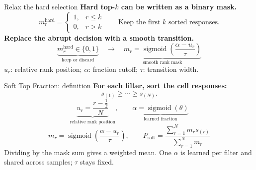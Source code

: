 \documentclass[aspectratio=169,10pt]{beamer}
\begin{document}
\begin{frame}{Relax the hard selection}
\textbf{Hard top-$k$ can be written as a binary mask.}
\[m_r^{\mathrm{hard}}=\begin{cases}1,&r\le k\\0,&r>k\end{cases}
\qquad\text{Keep the first $k$ sorted responses.}\]
\vspace{3mm}
\textbf{Replace the abrupt decision with a smooth transition.}
\[\underbrace{m_r^{\mathrm{hard}}\in\{0,1\}}_{\text{keep or discard}}
\quad\longrightarrow\quad
\underbrace{m_r=\operatorname{sigmoid}\!\left(\frac{\alpha-u_r}{\tau}\right)}_{\text{smooth rank mask}}\]
\small $u_r$: relative rank position; $\alpha$: fraction cutoff; $\tau$: transition width.
\end{frame}

\begin{frame}{Soft Top Fraction: definition}
\textbf{For each filter, sort the cell responses:}
\[s_{(1)}\ge\cdots\ge s_{(N)}.\]
\[\underbrace{u_r=\frac{r-\tfrac12}{N}}_{\text{relative rank position}},\qquad
\underbrace{\alpha=\operatorname{sigmoid}(\theta)}_{\text{learned fraction}}\]
\[m_r=\operatorname{sigmoid}\!\left(\frac{\alpha-u_r}{\tau}\right),\qquad
\boxed{P_{\mathrm{soft}}=\frac{\sum_{r=1}^{N}m_rs_{(r)}}{\sum_{r=1}^{N}m_r}}\]
\small Dividing by the mask sum gives a weighted mean. One $\alpha$ is learned per filter and shared across samples; $\tau$ stays fixed.
\end{frame}
\end{document}
